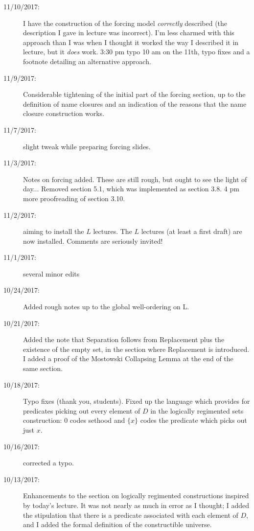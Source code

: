 \documentclass[12pt]{book}
\begin{document}
{\begin{description}
\item[11/10/2017:]  I have the construction of the forcing model {\em correctly\/} described (the description I gave in lecture was incorrect).  I'm less charmed with this approach than I was when I thought it worked the way I described it in lecture, but it {\em does\/} work.  3:30 pm typo  10 am on the 11th, typo fixes and a footnote detailing an alternative approach.

\item[11/9/2017:]  Considerable tightening of the initial part of the forcing section, up to the definition of name closures and an indication of the reasons that the name closure construction works.

\item[11/7/2017:]  slight tweak while preparing forcing slides.

\item[11/3/2017:]  Notes on forcing added.  These are still rough, but ought to see the light of day...  Removed section 5.1, which was implemented as section 3.8. 4 pm more proofreading of section 3.10.

\item[11/2/2017:]  aiming to install the $L$ lectures.  The $L$ lectures (at least a first draft) are now installed.  Comments are seriously invited!

\item[11/1/2017:]  several minor edits

\item[10/24/2017:]  Added rough notes up to the global well-ordering on L.

\item[10/21/2017:]  Added the note that Separation follows from Replacement plus the existence of the empty set, in the section where Replacement is introduced.  I added a proof of the Mostowski Collapsing Lemma at the end of the same section.

\item[10/18/2017:]  Typo fixes (thank you, students).  Fixed up the language which provides for predicates picking out every element of $D$ in the logically regimented sets construction:  0 codes sethood and $\{x\}$ codes the predicate which picks out just $x$.

\item[10/16/2017:]  corrected a typo.

\item[10/13/2017:]  Enhancements to the section on logically regimented constructions inspired by today's lecture.   It was not nearly as much in error as I thought;  I added the stipulation that there is a predicate associated with each element of $D$, and I added the formal definition of the constructible universe.


\end{description}}
\end{document}
